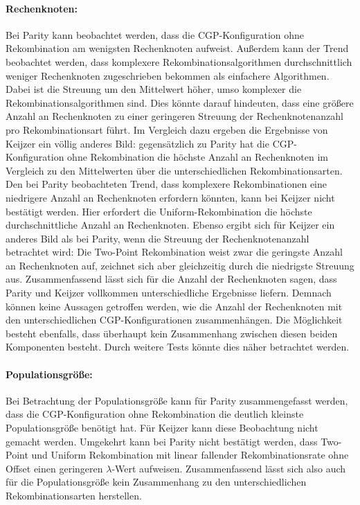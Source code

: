 \paragraph{Rechenknoten:} Bei Parity kann beobachtet werden, dass die CGP-Konfiguration ohne Rekombination am wenigsten Rechenknoten aufweist. 
Außerdem kann der Trend beobachtet werden, dass komplexere Rekombinationsalgorithmen durchschnittlich weniger Rechenknoten zugeschrieben bekommen als einfachere Algorithmen.
Dabei ist die Streuung um den Mittelwert höher, umso komplexer die Rekombinationsalgorithmen sind.
Dies könnte darauf hindeuten, dass eine größere Anzahl an Rechenknoten zu einer geringeren Streuung der Rechenknotenanzahl pro Rekombinationsart führt.
Im Vergleich dazu ergeben die Ergebnisse von Keijzer ein völlig anderes Bild: gegensätzlich zu Parity hat die CGP-Konfiguration ohne Rekombination die höchste Anzahl an Rechenknoten im Vergleich zu den Mittelwerten über die unterschiedlichen Rekombinationsarten.
Den bei Parity beobachteten Trend, dass komplexere Rekombinationen eine niedrigere Anzahl an Rechenknoten erfordern könnten, kann bei Keijzer nicht bestätigt werden.
Hier erfordert die Uniform-Rekombination die höchste durchschnittliche Anzahl an Rechenknoten.
Ebenso ergibt sich für Keijzer ein anderes Bild als bei Parity, wenn die Streuung der Rechenknotenanzahl betrachtet wird: Die Two-Point Rekombination weist zwar die geringste Anzahl an Rechenknoten auf, zeichnet sich aber gleichzeitig durch die niedrigste Streuung aus.
Zusammenfassend lässt sich für die Anzahl der Rechenknoten sagen, dass Parity und Keijzer vollkommen unterschiedliche Ergebnisse liefern.
Demnach können keine Aussagen getroffen werden, wie die Anzahl der Rechenknoten mit den unterschiedlichen CGP-Konfigurationen zusammenhängen.
Die Möglichkeit besteht ebenfalls, dass überhaupt kein Zusammenhang zwischen diesen beiden Komponenten besteht.
Durch weitere Tests könnte dies näher betrachtet werden.
\paragraph{Populationsgröße:} Bei Betrachtung der Populationsgröße kann für Parity zusammengefasst werden, dass die CGP-Konfiguration ohne Rekombination die deutlich kleinste Populationsgröße benötigt hat.
Für Keijzer kann diese Beobachtung nicht gemacht werden.
Umgekehrt kann bei Parity nicht bestätigt werden, dass Two-Point und Uniform Rekombination mit linear fallender Rekombinationsrate ohne Offset einen geringeren $\lambda$-Wert aufweisen.
Zusammenfassend lässt sich also auch für die Populationsgröße kein Zusammenhang zu den unterschiedlichen Rekombinationsarten herstellen.\\
